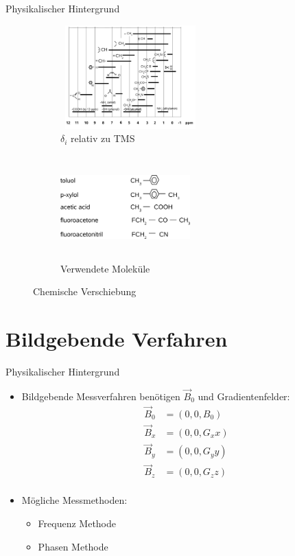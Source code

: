 \begin{frame}{Physikalischer Hintergrund}
	\begin{figure}
	\centering
	\begin{subfigure}{.49\textwidth}
	\centering
	\includegraphics[width=5.4cm, height=4cm]{images//shift.png}
	\caption{$\delta_i$ relativ zu TMS}
	\end{subfigure}
	\begin{subfigure}{.49\textwidth}
	\centering
	\includegraphics[width=5cm, height=4cm]{images//substances.png}
	\caption{Verwendete Moleküle}
	\end{subfigure}	
	\caption{Chemische Verschiebung \cite{script_nmr}}
	\end{figure}
\end{frame}




\section{Bildgebende Verfahren} %
\begin{frame}{Physikalischer Hintergrund}
	\begin{itemize}
	\item Bildgebende Messverfahren benötigen $\vec{B}_0$ und Gradientenfelder:
	\begin{align*}
	\vec{B}_0&=(0,0,B_0)\\
	\vec{B}_x&=(0,0,G_x x)\\
	\vec{B}_y&=(0,0,G_y y)\\
	\vec{B}_z&=(0,0,G_z z)\\
	\end{align*}
	\item Mögliche Messmethoden:
		\begin{itemize}
		\item Frequenz Methode
		\item Phasen Methode
		\end{itemize}
	\end{itemize}
\end{frame}

